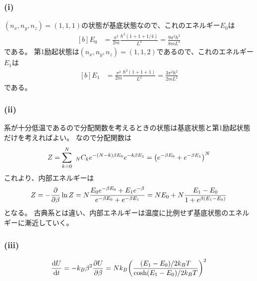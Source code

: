 \documentclass[../../sp_2017.tex]{subfiles}
\begin{document}
\subsubsection{(i)}
\((n_x,n_y,n_z)=(1,1,1)\)の状態が基底状態なので、これのエネルギー\(E_0\)は
\begin{equation}\begin{aligned}[b]
    E_0 &=\frac{\pi^2}{2m}\frac{\hbar^2(1+1+1/4)}{L^2}=\frac{9\pi^2\hbar^2}{8mL^2}
\end{aligned}\end{equation}
である。
第1励起状態は\((n_x,n_y,n_z)=(1,1,2)\)であるので、これのエネルギー\(E_1\)は
\begin{equation}\begin{aligned}[b]
    E_1 &=\frac{\pi^2}{2m}\frac{\hbar^2(1+1+1)}{L^2}=\frac{3\pi^2\hbar^2}{2mL^2}
\end{aligned}\end{equation}
である。

\subsubsection{(ii)}
系が十分低温であるので分配関数を考えるときの状態は基底状態と第1励起状態だけを考えればよい。
なので分配関数は
\begin{equation}\begin{aligned}[b]
    Z = \sum_{k=0}^{N}~_NC_ke^{-(N-k)\beta E_0}e^{-k\beta E_1}
    = \qty(e^{-\beta E_0}+e^{-\beta E_1})^N
\end{aligned}\end{equation}
これより、内部エネルギーは
\begin{equation}\begin{aligned}[b]
    Z = -\pdv{\beta}\ln Z= N\frac{E_0e^{-\beta E_0}+E_1e^{-\beta}}{e^{-\beta E_0}+e^{-\beta E_1}}
    =NE_0 +N\frac{E_1-E_0}{1+e^{\beta(E_1-E_0)}}
\end{aligned}\end{equation}
となる。
古典系とは違い、内部エネルギーは温度に比例せず基底状態のエネルギーに漸近していく。

\subsubsection{(iii)}
\begin{equation}\begin{aligned}[b]
    \dv{U}{t} = -k_B\beta^2\pdv{U}{\beta}=Nk_B\qty(\frac{(E_1-E_0)/2k_BT}{\cosh(E_1-E_0)/2k_BT})^2
\end{aligned}\end{equation}
\end{document}
